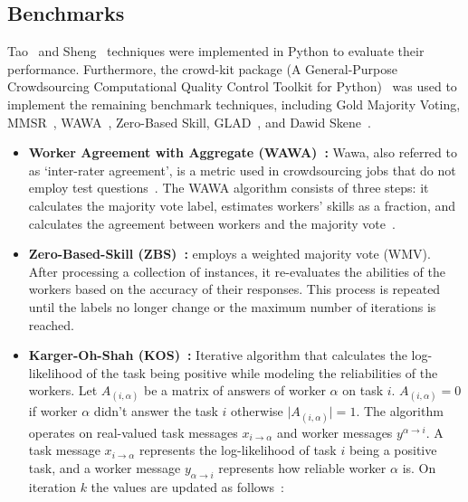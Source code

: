 \documentclass[sn-nature]{bst/sn-jnl}
\begin{document}
\subsection{Benchmarks}
Tao~\cite{tao_Label_2020} and Sheng~\cite{sheng_Majority_2019} techniques were implemented in Python to evaluate their performance. Furthermore, the crowd-kit package (A General-Purpose Crowdsourcing Computational Quality Control Toolkit for Python)~\cite{ustalov_learning_2021} was used to implement the remaining benchmark techniques, including Gold Majority Voting, MMSR~\cite{ma_Adversarial_2020}, WAWA~\cite{crowdkit_webpage_documentation}, Zero-Based Skill, GLAD~\cite{whitehill_Whose_2009}, and Dawid Skene~\cite{dawid_Maximum_1979}.
\begin{itemize}
    \item \textbf{Worker Agreement with Aggregate (WAWA)~\cite{crowdkit_webpage_documentation}:} Wawa, also referred to as `inter-rater agreement', is a metric used in crowdsourcing jobs that do not employ test questions~\cite{appen_wawa_2023}. The WAWA algorithm consists of three steps: it calculates the majority vote label, estimates workers' skills as a fraction, and calculates the agreement between workers and the majority vote~\cite{crowdkit_webpage_documentation}.
    \item \textbf{Zero-Based-Skill (ZBS)~\cite{crowdkit_webpage_documentation}:} employs a weighted majority vote (WMV). After processing a collection of instances, it re-evaluates the abilities of the workers based on the accuracy of their responses. This process is repeated until the labels no longer change or the maximum number of iterations is reached.
    \item \textbf{Karger-Oh-Shah (KOS)~\cite{crowdkit_webpage_documentation}:} Iterative algorithm that calculates the log-likelihood of the task being positive while modeling the reliabilities of the workers. Let $A_{(i,\alpha)} $ be a matrix of answers of worker $\alpha $ on task $i $. $A_{(i,\alpha)} = 0 $ if worker $\alpha $ didn't answer the task $i $ otherwise $\vert A_{(i,\alpha)} \vert = 1 $. The algorithm operates on real-valued task messages $x_{i \rightarrow \alpha} $  and worker messages $y^{\alpha \rightarrow i} $. A task message $x_{i \rightarrow \alpha} $ represents the log-likelihood of task $i $ being a positive task, and a worker message $y_{\alpha \rightarrow i} $ represents how reliable worker $\alpha $ is. On iteration $k$ the values are updated as follows~\cite{crowdkit_webpage_documentation}:
    \begin{equation}

\end{equation}
\end{itemize}
\end{document}

